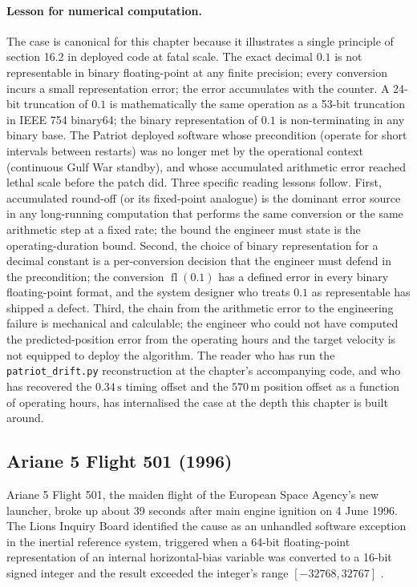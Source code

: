\paragraph{Lesson for numerical computation.}
The case is canonical for this chapter because it illustrates a
single principle of section 16.2 in deployed code at fatal scale.
The exact decimal $0.1$ is not representable in binary
floating-point at any finite precision; every conversion incurs a
small representation error; the error accumulates with the
counter. A 24-bit truncation of $0.1$ is mathematically the same
operation as a 53-bit truncation in IEEE 754 binary64; the binary
representation of $0.1$ is non-terminating in any binary base. The
Patriot deployed software whose precondition (operate for short
intervals between restarts) was no longer met by the operational
context (continuous Gulf War standby), and whose accumulated
arithmetic error reached lethal scale before the patch did. Three
specific reading lessons follow. First, accumulated round-off (or
its fixed-point analogue) is the dominant error source in any
long-running computation that performs the same conversion or the
same arithmetic step at a fixed rate; the bound the engineer must
state is the operating-duration bound. Second, the choice of binary
representation for a decimal constant is a per-conversion decision
that the engineer must defend in the precondition; the conversion
$\operatorname{fl}(0.1)$ has a defined error in every binary
floating-point format, and the system designer who treats $0.1$ as
representable has shipped a defect. Third, the chain from the
arithmetic error to the engineering failure is mechanical and
calculable; the engineer who could not have computed the
predicted-position error from the operating hours and the target
velocity is not equipped to deploy the algorithm. The reader who
has run the \texttt{patriot\_drift.py} reconstruction at the
chapter's accompanying code, and who has recovered the
$0.34 \,\text{s}$ timing offset and the $570 \,\text{m}$
position offset as a function of operating hours, has internalised
the case at the depth this chapter is built around.

\subsection{Ariane 5 Flight 501 (1996)}

Ariane 5 Flight 501, the maiden flight of the European Space
Agency's new launcher, broke up about 39 seconds after main
engine ignition on 4 June 1996. The Lions Inquiry Board
identified the cause as an unhandled software exception in the
inertial reference system, triggered when a 64-bit floating-point
representation of an internal horizontal-bias variable was
converted to a 16-bit signed integer and the result exceeded the
integer's range $[-32768, 32767]$ \cite{acc:ariane501-ifr}.

